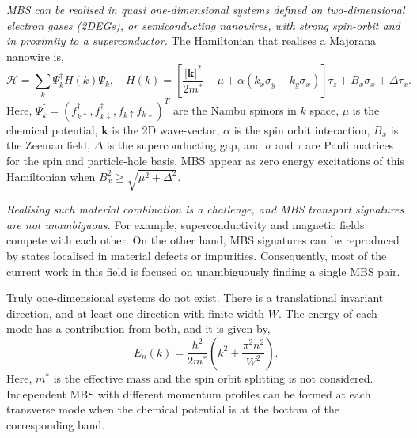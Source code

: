 \textit{MBS can be realised in quasi one-dimensional systems defined on two-dimensional electron gases (2DEGs), or semiconducting nanowires, with strong spin-orbit and in proximity to a superconductor.}
The Hamiltonian that realises a Majorana nanowire\cite{Alicea2011} is,
\begin{equation}\label{eq:ham_maj}
\mathcal{H} = \sum_k \Psi_k^\dagger H(k) \Psi_k  ,\quad H(k) =  \left[ \frac{|\mathbf{k}|^2}{2 m^*} - \mu + \alpha(k_x \sigma_y - k_y \sigma_x) \right] \tau_z + B_x \sigma_x  + \Delta \tau_x.
\end{equation}
Here, $\Psi_k^\dagger = (f_{k\uparrow}^\dagger, f_{k\downarrow}^\dagger, f_{k\uparrow} f_{k\downarrow})^T$ are the Nambu spinors in $k$ space, $\mu$ is the chemical potential, $\mathbf{k}$ is the 2D wave-vector, $\alpha$ is the spin orbit interaction, $B_x$ is the Zeeman field, $\Delta$ is the superconducting gap, and $\sigma$ and $\tau$ are Pauli matrices for the spin and particle-hole basis.
MBS appear as zero energy excitations of this Hamiltonian when $B_x^2 \geq \sqrt{\mu^2 + \Delta^2}$.

\textit{Realising such material combination is a challenge, and MBS transport signatures are not unambiguous\cite{Vuik2019,Liu2018}.}
For example, superconductivity and magnetic fields compete with each other.
On the other hand, MBS signatures can be reproduced by states localised in material defects or impurities.
Consequently, most of the current work in this field is focused on unambiguously finding a single MBS pair.

Truly one-dimensional systems do not exist.
There is a translational invariant direction, and at least one direction with finite width $W$.
The energy of each mode has a contribution from both, and it is given by,
\begin{equation}
E_{n}(k) = \frac{\hbar^{2}}{2m^*} \left( k^{2} + \frac{\pi^{2} n^{2}}{W^{2}} \right).
\end{equation}
Here, $m^{*}$ is the effective mass and the spin orbit splitting is not considered.
Independent MBS with different momentum profiles can be formed at each transverse mode when the chemical potential is at the bottom of the corresponding band\cite{Reeg2018}.

